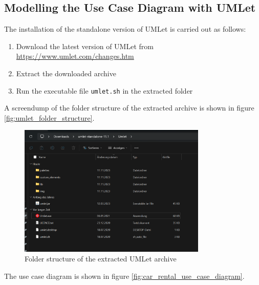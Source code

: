 \subsection*{Modelling the Use Case Diagram with UMLet}
The installation of the standalone version of UMLet is carried out as follows:
\begin{enumerate}
    \item Download the latest version of UMLet from \url{https://www.umlet.com/changes.htm}
    \item Extract the downloaded archive
    \item Run the executable file \texttt{umlet.sh} in the extracted folder
\end{enumerate}

A screendump of the folder structure of the extracted archive is shown in figure \autoref{fig:umlet_folder_structure}.
\begin{figure}
    \centering
    \includegraphics[width=0.8\textwidth]{figures/goLang/carRental/carRental_umletInstallation.png}
    \caption{Folder structure of the extracted UMLet archive}
    \label{fig:umlet_folder_structure}
\end{figure}

The use case diagram is shown in figure \autoref{fig:car_rental_use_case_diagram}.


